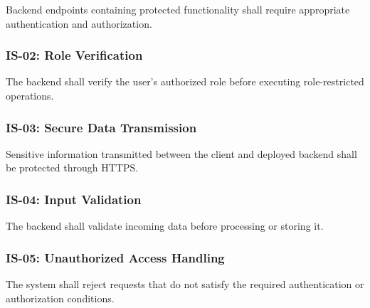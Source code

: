 Backend endpoints containing protected functionality shall require
appropriate authentication and authorization.

\subsubsection{IS-02: Role Verification}

The backend shall verify the user's authorized role before executing
role-restricted operations.

\subsubsection{IS-03: Secure Data Transmission}

Sensitive information transmitted between the client and deployed backend
shall be protected through HTTPS.

\subsubsection{IS-04: Input Validation}

The backend shall validate incoming data before processing or storing it.

\subsubsection{IS-05: Unauthorized Access Handling}

The system shall reject requests that do not satisfy the required
authentication or authorization conditions.